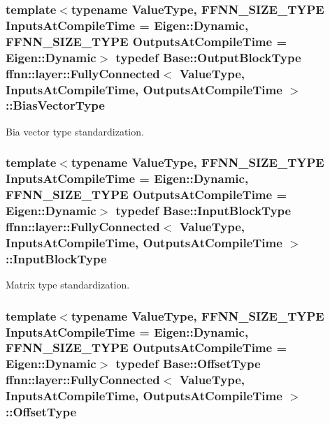 \hypertarget{classffnn_1_1layer_1_1_fully_connected_a926ff519682fa1bedd4c38159d5fd4bb}{
\subsubsection[{Bias\-Vector\-Type}]{\setlength{\rightskip}{0pt plus 5cm}template$<$typename Value\-Type, F\-F\-N\-N\-\_\-\-S\-I\-Z\-E\-\_\-\-T\-Y\-P\-E Inputs\-At\-Compile\-Time = Eigen\-::\-Dynamic, F\-F\-N\-N\-\_\-\-S\-I\-Z\-E\-\_\-\-T\-Y\-P\-E Outputs\-At\-Compile\-Time = Eigen\-::\-Dynamic$>$ typedef {\bf Base\-::\-Output\-Block\-Type} {\bf ffnn\-::layer\-::\-Fully\-Connected}$<$ Value\-Type, Inputs\-At\-Compile\-Time, Outputs\-At\-Compile\-Time $>$\-::{\bf Bias\-Vector\-Type}}}\label{classffnn_1_1layer_1_1_fully_connected_a926ff519682fa1bedd4c38159d5fd4bb}


Bia vector type standardization. 

\hypertarget{classffnn_1_1layer_1_1_fully_connected_a8fb8f9b598085d3a05214f38f70adfc7}{
\subsubsection[{Input\-Block\-Type}]{\setlength{\rightskip}{0pt plus 5cm}template$<$typename Value\-Type, F\-F\-N\-N\-\_\-\-S\-I\-Z\-E\-\_\-\-T\-Y\-P\-E Inputs\-At\-Compile\-Time = Eigen\-::\-Dynamic, F\-F\-N\-N\-\_\-\-S\-I\-Z\-E\-\_\-\-T\-Y\-P\-E Outputs\-At\-Compile\-Time = Eigen\-::\-Dynamic$>$ typedef {\bf Base\-::\-Input\-Block\-Type} {\bf ffnn\-::layer\-::\-Fully\-Connected}$<$ Value\-Type, Inputs\-At\-Compile\-Time, Outputs\-At\-Compile\-Time $>$\-::{\bf Input\-Block\-Type}}}\label{classffnn_1_1layer_1_1_fully_connected_a8fb8f9b598085d3a05214f38f70adfc7}


Matrix type standardization. 

\hypertarget{classffnn_1_1layer_1_1_fully_connected_a2f79588f597650dc086dfecfc3875d4f}{
\subsubsection[{Offset\-Type}]{\setlength{\rightskip}{0pt plus 5cm}template$<$typename Value\-Type, F\-F\-N\-N\-\_\-\-S\-I\-Z\-E\-\_\-\-T\-Y\-P\-E Inputs\-At\-Compile\-Time = Eigen\-::\-Dynamic, F\-F\-N\-N\-\_\-\-S\-I\-Z\-E\-\_\-\-T\-Y\-P\-E Outputs\-At\-Compile\-Time = Eigen\-::\-Dynamic$>$ typedef {\bf Base\-::\-Offset\-Type} {\bf ffnn\-::layer\-::\-Fully\-Connected}$<$ Value\-Type, Inputs\-At\-Compile\-Time, Outputs\-At\-Compile\-Time $>$\-::{\bf Offset\-Type}}}\label{classffnn_1_1layer_1_1_fully_connected_a2f79588f597650dc086dfecfc3875d4f}


